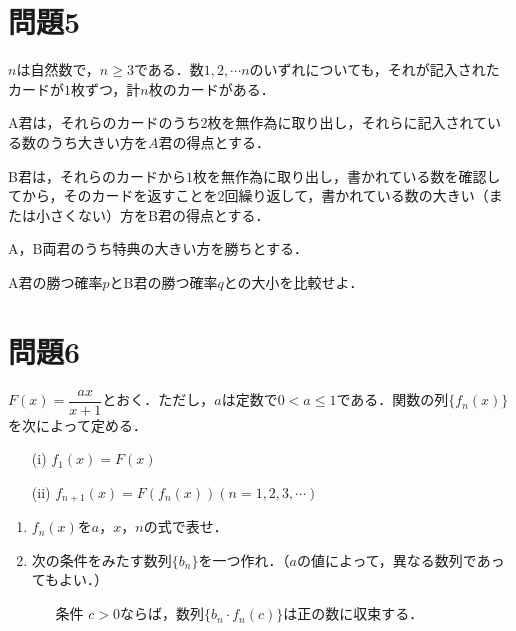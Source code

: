 \documentclass[unicode,12pt, A4j]{ltjsarticle}%
\begin{document}
\section{問題5}
$n$は自然数で，$n\ge 3$である．数$1, 2,\cdots n$のいずれについても，それが記入されたカードが$1$枚ずつ，計$n$枚のカードがある．

A君は，それらのカードのうち$2$枚を無作為に取り出し，それらに記入されている数のうち大きい方を$A$君の得点とする．

B君は，それらのカードから$1$枚を無作為に取り出し，書かれている数を確認してから，そのカードを返すことを$2$回繰り返して，書かれている数の大きい（または小さくない）方をB君の得点とする．

A，B両君のうち特典の大きい方を勝ちとする．

A君の勝つ確率$p$とB君の勝つ確率$q$との大小を比較せよ．

\section{問題6}
$F(x)=\dfrac{ax}{x+1}$とおく．ただし，$a$は定数で$0 < a\le 1$である．関数の列$\{f_n(x)\}$を次によって定める．

\begin{itemize}
 \item[(i)] $f_1(x)=F(x)$
 \item[(ii)] $f_{n+1}(x)=F(f_n(x)) (n=1,2,3,\cdots)$
\end{itemize}
\begin{enumerate}
 \item $f_n(x)$を$a$，$x$，$n$の式で表せ．
 \item 次の条件をみたす数列$\{b_n\}$を一つ作れ．（$a$の値によって，異なる数列であってもよい．）
\begin{itemize}
 \item[条件] $c>0$ならば，数列$\{b_n\cdot f_n(c)\}$は正の数に収束する．
\end{itemize}
\end{enumerate}
\end{document}
